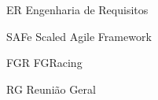 \begin{siglas}
  \item[ER] Engenharia de Requisitos
  \item[SAFe] Scaled Agile Framework
  \item[FGR] FGRacing
  \item[RG] Reunião Geral
  
\end{siglas}
